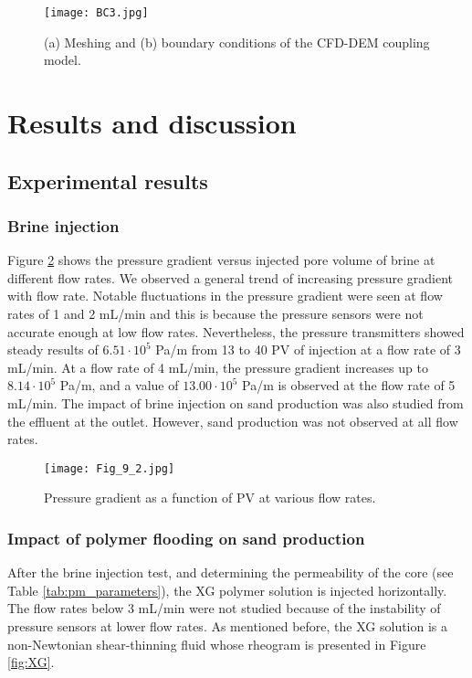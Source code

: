 \documentclass{article}
\begin{document}
\begin{figure}[H]
\begin{centering}
\texttt{[image: BC3.jpg]}
\par\end{centering}
\caption{(a) Meshing and (b) boundary conditions of the CFD-DEM coupling model.\label{fig:BC}}
\end{figure}

\section{Results and discussion}
\label{sec:results}
\subsection{Experimental results}

\subsubsection{Brine injection}
Figure \ref{fig:brine_inj} shows the pressure gradient versus injected pore volume of brine at different flow rates. We observed a general trend of increasing pressure gradient with flow rate. Notable fluctuations in the pressure gradient were seen at flow rates of 1 and 2 mL/min and this is because the pressure sensors were not accurate enough at low flow rates. Nevertheless, the pressure transmitters showed steady results of $6.51 \cdot 10^{5}$ Pa/m from 13 to 40 PV of injection at a flow rate of 3 mL/min. At a flow rate of 4 mL/min, the pressure gradient increases up to $8.14 \cdot 10^{5}$ Pa/m, and a value of $13.00 \cdot 10^{5}$ Pa/m is observed at the flow rate of 5 mL/min. The impact of brine injection on sand production was also studied from the effluent at the outlet. However, sand production was not observed at all flow rates.
\begin{figure}[H]
\begin{centering}
\texttt{[image: Fig\_9\_2.jpg]}
\par\end{centering}
\caption{Pressure gradient as a function of PV at various flow rates.\label{fig:brine_inj}}
\end{figure}

\subsubsection{Impact of polymer flooding on sand production}
After the brine injection test, and determining the permeability of the core (see Table \ref{tab:pm_parameters}), the XG polymer solution is injected horizontally. The flow rates below 3 mL/min were not studied because of the instability of pressure sensors at lower flow rates. As mentioned before, the XG solution is a non-Newtonian shear-thinning fluid whose rheogram is presented in Figure \ref{fig:XG}. 
\end{document}
